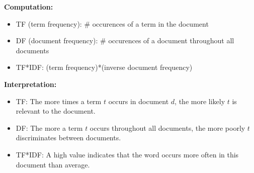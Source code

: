 \documentclass[10pt,a4paper]{scrartcl}
\begin{document}


\textbf{Computation:}
\begin{itemize}
	\item TF (term frequency): \# occurences of a term in the document
	\item DF (document frequency): \# occurences of a document throughout all documents
	\item TF*IDF: (term frequency)*(inverse document frequency)
\end{itemize}
\textbf{Interpretation:}
\begin{itemize}
	\item TF: The more times a term $t$ occurs in document $d$, the more likely $t$ is relevant to the document.
	\item DF: The more a term $t$ occurs throughout all documents, the more poorly $t$ discriminates between documents.
	\item TF*IDF: A high value indicates that the word occurs more often in this document than average.
\end{itemize}
\end{document}
